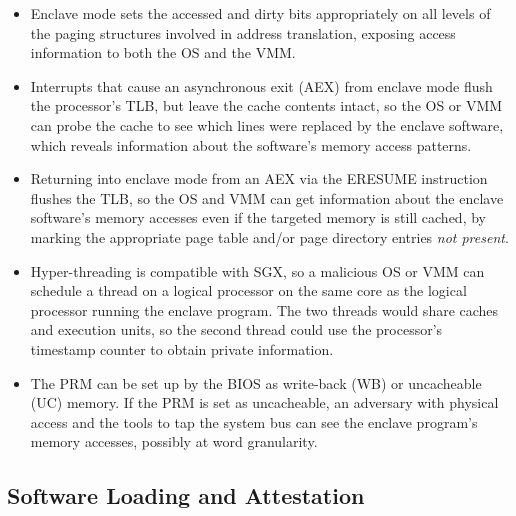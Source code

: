 \begin{itemize}

\item Enclave mode sets the accessed and dirty bits appropriately on all levels
      of the paging structures involved in address translation, exposing access
      information to both the OS and the VMM.

\item Interrupts that cause an asynchronous exit (AEX) from enclave mode flush
      the processor's TLB, but leave the cache contents intact, so the OS or
      VMM can probe the cache to see which lines were replaced by the enclave
      software, which reveals information about the software's memory access
      patterns.

\item Returning into enclave mode from an AEX via the ERESUME instruction
      flushes the TLB, so the OS and VMM can get information about the enclave
      software's memory accesses even if the targeted memory is still cached,
      by marking the appropriate page table and/or page directory entries
      \textit{not present}.

\item Hyper-threading is compatible with SGX, so a malicious OS or VMM can
      schedule a thread on a logical processor on the same core as the logical
      processor running the enclave program. The two threads would share
      caches and execution units, so the second thread could use the
      processor's timestamp counter \cite{petters1999making} to obtain private
      information.

\item The PRM can be set up by the BIOS as write-back (WB) or uncacheable (UC)
      memory. If the PRM is set as uncacheable, an adversary with physical
      access and the tools to tap the system bus can see the enclave program's
      memory accesses, possibly at word granularity.

\end{itemize}


\subsection{Software Loading and Attestation}

